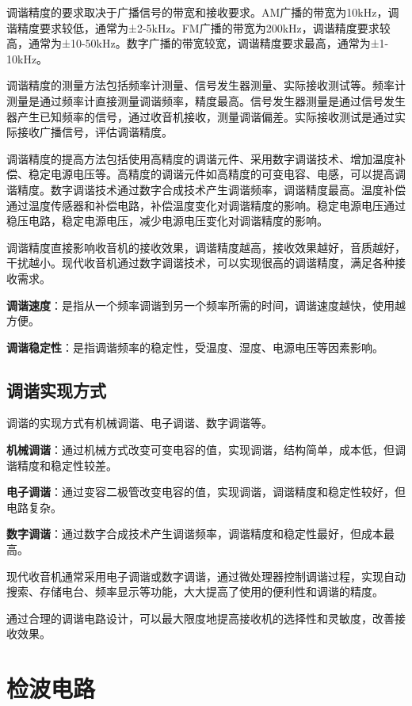 \documentclass[12pt,UTF8]{ctexbook}
\begin{document}
调谐精度的要求取决于广播信号的带宽和接收要求。AM广播的带宽为10kHz，调谐精度要求较低，通常为±2-5kHz。FM广播的带宽为200kHz，调谐精度要求较高，通常为±10-50kHz。数字广播的带宽较宽，调谐精度要求最高，通常为±1-10kHz。

调谐精度的测量方法包括频率计测量、信号发生器测量、实际接收测试等。频率计测量是通过频率计直接测量调谐频率，精度最高。信号发生器测量是通过信号发生器产生已知频率的信号，通过收音机接收，测量调谐偏差。实际接收测试是通过实际接收广播信号，评估调谐精度。

调谐精度的提高方法包括使用高精度的调谐元件、采用数字调谐技术、增加温度补偿、稳定电源电压等。高精度的调谐元件如高精度的可变电容、电感，可以提高调谐精度。数字调谐技术通过数字合成技术产生调谐频率，调谐精度最高。温度补偿通过温度传感器和补偿电路，补偿温度变化对调谐精度的影响。稳定电源电压通过稳压电路，稳定电源电压，减少电源电压变化对调谐精度的影响。

调谐精度直接影响收音机的接收效果，调谐精度越高，接收效果越好，音质越好，干扰越小。现代收音机通过数字调谐技术，可以实现很高的调谐精度，满足各种接收需求。

\textbf{调谐速度}：是指从一个频率调谐到另一个频率所需的时间，调谐速度越快，使用越方便。

\textbf{调谐稳定性}：是指调谐频率的稳定性，受温度、湿度、电源电压等因素影响。

\section{调谐实现方式}

调谐的实现方式有机械调谐、电子调谐、数字调谐等。

\textbf{机械调谐}：通过机械方式改变可变电容的值，实现调谐，结构简单，成本低，但调谐精度和稳定性较差。

\textbf{电子调谐}：通过变容二极管改变电容的值，实现调谐，调谐精度和稳定性较好，但电路复杂。

\textbf{数字调谐}：通过数字合成技术产生调谐频率，调谐精度和稳定性最好，但成本最高。

现代收音机通常采用电子调谐或数字调谐，通过微处理器控制调谐过程，实现自动搜索、存储电台、频率显示等功能，大大提高了使用的便利性和调谐的精度。

通过合理的调谐电路设计，可以最大限度地提高接收机的选择性和灵敏度，改善接收效果。

\chapter{检波电路}
\end{document}
